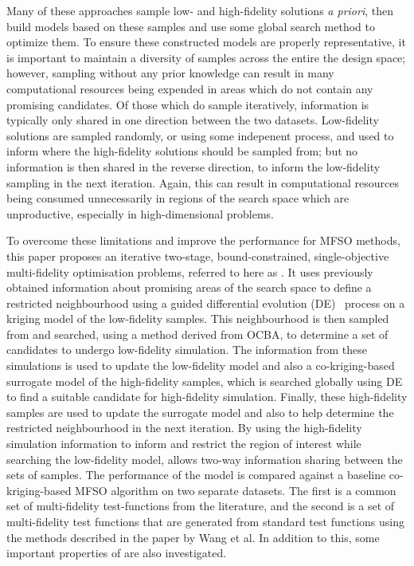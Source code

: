Many of these approaches sample low- and high-fidelity solutions \emph{a priori}, then build models based on these samples and use some global search method to optimize them. To ensure these constructed models are properly representative, it is important to maintain a diversity of samples across the entire the design space; however, sampling without any prior knowledge can result in many computational resources being expended in areas which do not contain any promising candidates. Of those which do sample iteratively, information is typically only shared in one direction between the two datasets. Low-fidelity solutions are sampled randomly, or using some indepenent process, and used to inform where the high-fidelity solutions should be sampled from; but no information is then shared in the reverse direction, to inform the low-fidelity sampling in the next iteration. Again, this can result in computational resources being consumed unnecessarily in regions of the search space which are unproductive, especially in high-dimensional problems. 


To overcome these limitations and improve the performance for MFSO methods, this paper proposes an iterative two-stage, bound-constrained, single-objective multi-fidelity optimisation problems, referred to here as \AlgName{}. It uses previously obtained information about promising areas of the search space to define a restricted neighbourhood using a guided differential evolution (DE)~\cite{storn1997differential} process on a kriging model of the low-fidelity samples. This neighbourhood is then sampled from and searched, using a method derived from OCBA, to determine a set of candidates to undergo low-fidelity simulation. The information from these simulations is used to update the low-fidelity model and also a co-kriging-based surrogate model of the high-fidelity samples, which is searched globally using DE to find a suitable candidate for high-fidelity simulation. Finally, these high-fidelity samples are used to update the surrogate model and also to help determine the restricted neighbourhood in the next iteration. By using the high-fidelity simulation information to inform and restrict the region of interest while searching the low-fidelity model, \AlgName{} allows two-way information sharing between the sets of samples. The performance of the \AlgName{} model is compared against a baseline co-kriging-based MFSO algorithm on two separate datasets. The first is a common set of multi-fidelity test-functions from the literature, and the second is a set of multi-fidelity test functions that are generated from standard test functions using the methods described in the paper by Wang et al. In addition to this, some important properties of \AlgName{} are also investigated.

